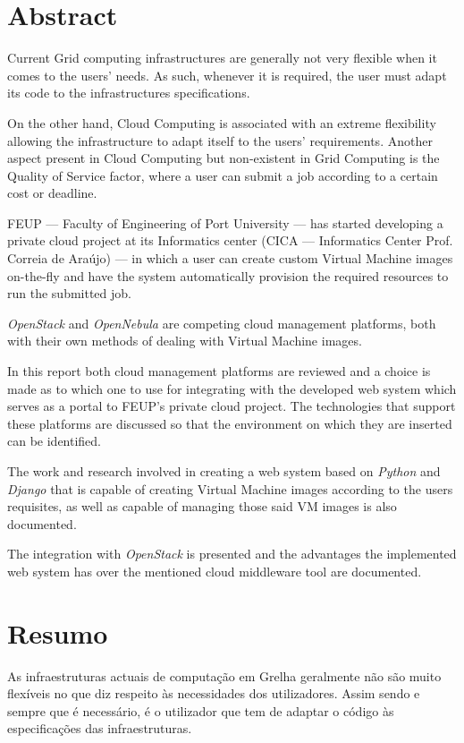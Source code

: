 \chapter*{Abstract}

Current Grid computing infrastructures are generally not very flexible when it comes to the users' needs. As such, whenever it is required, the user must adapt its code to the infrastructures specifications.

On the other hand, Cloud Computing is associated with an extreme flexibility allowing the infrastructure to adapt itself to the users' requirements. Another aspect present in Cloud Computing but non-existent in Grid Computing is the Quality of Service factor, where a user can submit a job according to a certain cost or deadline.

FEUP --- Faculty of Engineering of Port University --- has started developing a private cloud project at its Informatics center (CICA --- Informatics Center Prof. Correia de Araújo) --- in which a user can create custom Virtual Machine images on-the-fly and have the system automatically provision the required resources to run the submitted job.

\textit{OpenStack} and \textit{OpenNebula} are competing cloud management platforms, both with their own methods of dealing with Virtual Machine images. 

In this report both cloud management platforms are reviewed and a choice is made as to which one to use for integrating with the developed web system which serves as a portal to FEUP's private cloud project. The technologies that support these platforms are discussed so that the environment on which they are inserted can be identified.

The work and research involved in creating a web system based on \textit{Python} and \textit{Django} that is capable of creating Virtual Machine images according to the users requisites, as well as capable of managing those said VM images is also documented. 

The integration with \textit{OpenStack} is presented and the advantages the implemented web system has over the mentioned cloud middleware tool are documented.


\chapter*{Resumo}

As infraestruturas actuais de computação em Grelha geralmente não são muito flexíveis no que diz respeito às necessidades dos utilizadores. Assim sendo e sempre que é necessário, é o utilizador que tem de adaptar o código às especificações das infraestruturas.

